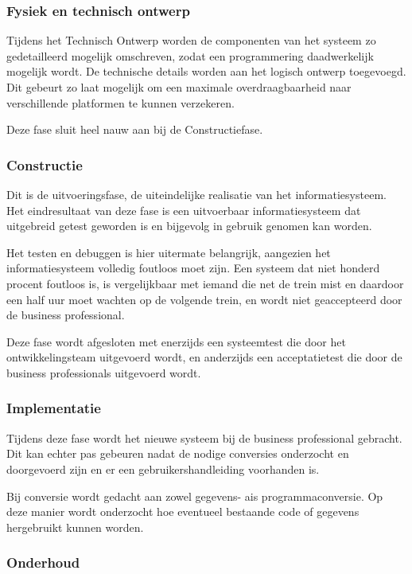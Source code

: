 \subsubsection{Fysiek en technisch ontwerp}

Tijdens het Technisch Ontwerp worden de componenten van het systeem zo gedetailleerd mogelijk omschreven, zodat een programmering daadwerkelijk mogelijk wordt. De technische details worden aan het logisch ontwerp toegevoegd. Dit gebeurt zo laat mogelijk om een maximale overdraagbaarheid naar verschillende platformen te kunnen verzekeren.

Deze fase sluit heel nauw aan bij de Constructiefase.

\subsubsection{Constructie}

Dit is de uitvoeringsfase, de uiteindelijke realisatie van het informatiesysteem. Het eindresultaat van deze fase is een uitvoerbaar informatiesysteem dat uitgebreid getest geworden is en bijgevolg in gebruik genomen kan worden.

Het testen en debuggen is hier uitermate belangrijk, aangezien het informatiesysteem volledig foutloos moet zijn. Een systeem dat niet honderd procent foutloos is, is vergelijkbaar met iemand die net de trein mist en daardoor een half uur moet wachten op de volgende trein, en wordt niet geaccepteerd door de business professional.

Deze fase wordt afgesloten met enerzijds een systeemtest die door het ontwikkelingsteam uitgevoerd wordt, en anderzijds een acceptatietest die door de business professionals uitgevoerd wordt.

\subsubsection{Implementatie}

Tijdens deze fase wordt het nieuwe systeem bij de business professional gebracht. Dit kan echter pas gebeuren nadat de nodige conversies onderzocht en doorgevoerd zijn en er een gebruikershandleiding voorhanden is.

Bij conversie wordt gedacht aan zowel gegevens- ais programmaconversie. Op deze manier wordt onderzocht hoe eventueel bestaande code of gegevens hergebruikt kunnen worden.

\subsubsection{Onderhoud}

